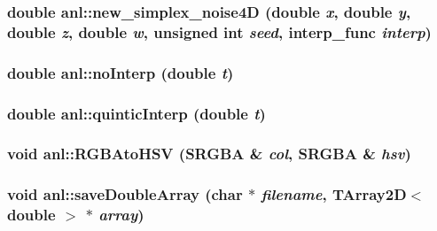 \label{namespaceanl_a977bc8430a8d2d5ef7a2c66d9f91cc86}
\hypertarget{namespaceanl_a652dc6981a12418072f970563ada7af1}{
\subsubsection[{new\_\-simplex\_\-noise4D}]{\setlength{\rightskip}{0pt plus 5cm}double anl::new\_\-simplex\_\-noise4D (double {\em x}, \/  double {\em y}, \/  double {\em z}, \/  double {\em w}, \/  unsigned int {\em seed}, \/  interp\_\-func {\em interp})}}
\label{namespaceanl_a652dc6981a12418072f970563ada7af1}
\hypertarget{namespaceanl_a8fe5f45ca9fede2abfa5f0f54e191fdc}{
\subsubsection[{noInterp}]{\setlength{\rightskip}{0pt plus 5cm}double anl::noInterp (double {\em t})}}
\label{namespaceanl_a8fe5f45ca9fede2abfa5f0f54e191fdc}
\hypertarget{namespaceanl_a493bd7a0c2877728adce6adc9f0d58fc}{
\subsubsection[{quinticInterp}]{\setlength{\rightskip}{0pt plus 5cm}double anl::quinticInterp (double {\em t})}}
\label{namespaceanl_a493bd7a0c2877728adce6adc9f0d58fc}
\hypertarget{namespaceanl_ac7feb7da75c2fe6eaf3b877a9fb6ac22}{
\subsubsection[{RGBAtoHSV}]{\setlength{\rightskip}{0pt plus 5cm}void anl::RGBAtoHSV (SRGBA \& {\em col}, \/  SRGBA \& {\em hsv})}}
\label{namespaceanl_ac7feb7da75c2fe6eaf3b877a9fb6ac22}
\hypertarget{namespaceanl_afc417846b4790dc37e817455621a68b4}{
\subsubsection[{saveDoubleArray}]{\setlength{\rightskip}{0pt plus 5cm}void anl::saveDoubleArray (char $\ast$ {\em filename}, \/  {\bf TArray2D}$<$ double $>$ $\ast$ {\em array})}}
